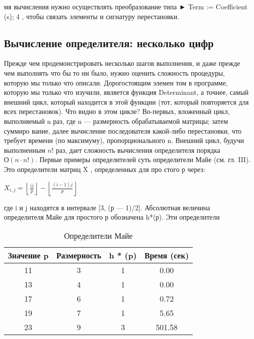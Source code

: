мя вычисления нужно осуществлять преобразование типа ► Term :=
Coefficient (s); 4 , чтобы связать элементы и сигнатуру перестановки.

\subsection{Вычисление определителя: несколько цифр}

Прежде чем продемонстрировать несколько шагов выполнения, и даже
прежде чем выполнять что бы то ни было, нужно оценить сложность
процедуры, которую мы только что описали. Дорогостоящим элемен­
том в программе, которую мы только что изучили, является функция
Determinant, а точнее, самый внешний цикл, который находится в этой
функции (тот, который повторяется для всех перестановок).
Что видно в этом цикле? Во-первых, вложенный цикл, выполняемый
n раз, где n — размерность обрабатываемой матрицы; затем суммиро­
вание, далее вычисление последователя какой-либо перестановки, что
требует времени (по максимуму), пропорционального n. Внешний цикл,
будучи выполненным $n!$ раз, дает сложность вычисления определителя
порядка $О(n \cdot n!)$. Первые примеры определителей суть определители
Майе (см. гл. III). Это определители матриц X , определенных для про­
стого р через:

\begin{center}
\( X_{i,j} = \left\lfloor \frac{ij}{p} \right\rfloor - \left\lfloor \frac{(i-1)j}{p} \right\rfloor \)
\end{center}

где i и j находятся в интервале [3, (р — 1)/2]. Абсолютная величина
определителя Майе для простого р обозначена h*(р). Эти определители

\begin{wraptable}{l}{10cm}
\begin{tabular}{|c|c|c|c|}
\hline
Значение p & Размерность & h * (p) & Время (сек) \\ \hline
11 & 3 & 1 & 0.00 \\
13 & 4 & 1 & 0.00 \\
17 & 6 & 1 & 0.72 \\
19 & 7 & 1 & 5.65 \\
23 & 9 & 3 & 501.58 \\ \hline
\end{tabular}
\caption{Определители Майе}
\end{wraptable} 

